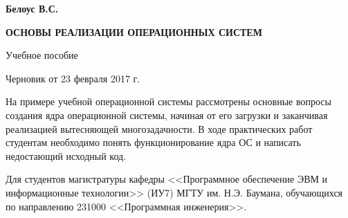 
\begin{center}

\Huge{\textbf{Белоус В.С.}}

\vskip 2cm

\Huge{\textbf{ОСНОВЫ РЕАЛИЗАЦИИ ОПЕРАЦИОННЫХ СИСТЕМ}}

\vskip 4cm

Учебное пособие

\vskip 1cm

Черновик от 23 февраля 2017 г.
\end{center}

\vskip 6cm

На примере учебной операционной системы рассмотрены основные вопросы создания
ядра операционной системы, начиная от его загрузки и заканчивая реализацией
вытесняющей многозадачности. В ходе практических работ студентам необходимо
понять функционирование ядра ОС и написать недостающий исходный код.

Для студентов магистратуры кафедры <<Программное обеспечение ЭВМ и
информационные технологии>> (ИУ7) МГТУ им. Н.Э. Баумана, обучающихся по
направлению 231000 <<Программная инженерия>>.
